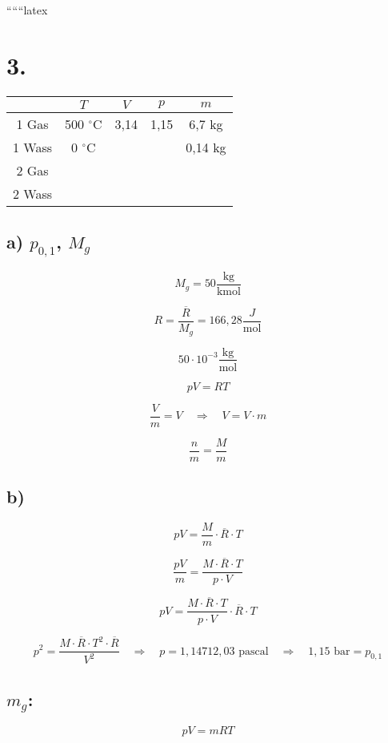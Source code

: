 
``````latex


\section*{3.}

\begin{tabular}{|c|c|c|c|c|}
\hline
 & $T$ & $V$ & $p$ & $m$ \\
\hline
1 Gas & 500 $^\circ$C & 3,14 & 1,15 & 6,7 kg \\
\hline
1 Wass & 0 $^\circ$C &  &  & 0,14 kg \\
\hline
2 Gas &  &  &  &  \\
\hline
2 Wass &  &  &  &  \\
\hline
\end{tabular}

\subsection*{a) $p_{0,1}$, $M_g$}

\[
M_g = 50 \frac{\text{kg}}{\text{kmol}}
\]

\[
R = \frac{\overline{R}}{M_g} = 166,28 \frac{J}{\text{mol}}
\]

\[
50 \cdot 10^{-3} \frac{\text{kg}}{\text{mol}}
\]

\[
pV = RT
\]

\[
\frac{V}{m} = V \quad \Rightarrow \quad V = V \cdot m
\]

\[
\frac{n}{m} = \frac{M}{m}
\]

\subsection*{b)}

\[
pV = \frac{M}{m} \cdot \overline{R} \cdot T
\]

\[
\frac{pV}{m} = \frac{M \cdot \overline{R} \cdot T}{p \cdot V}
\]

\[
pV = \frac{M \cdot \overline{R} \cdot T}{p \cdot V} \cdot \overline{R} \cdot T
\]

\[
p^2 = \frac{M \cdot \overline{R} \cdot T^2 \cdot \overline{R}}{V^2} \quad \Rightarrow \quad p = 1,14712,03 \text{ pascal} \quad \Rightarrow \quad 1,15 \text{ bar} = p_{0,1}
\]

\subsection*{$m_g$:}

\[
pV = mRT
\]

